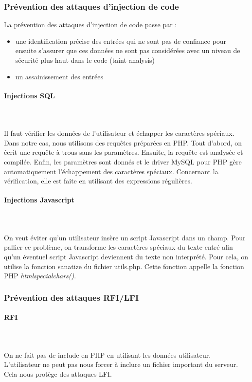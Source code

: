 \documentclass[a4paper]{article}
\begin{document}
\subsubsection{Prévention des attaques d'injection de code}
La prévention des attaques d'injection de code passe par :
\begin{itemize}
	\item une identification précise des entrées qui ne sont pas de
		confiance pour ensuite s'assurer que ces données ne sont pas
		considérées avec un niveau de sécurité plus haut dans le code
		(taint analysis) 
	\item un assainissement des entrées
\end{itemize}
		
\paragraph{Injections SQL}
~~\\
\\
Il faut vérifier les données de l'utilisateur et échapper les caractères spéciaux.
Dans notre cas, nous utilisons des requêtes préparées en PHP.
Tout d'abord, on écrit une requête à trous sans les paramètres. Ensuite, la
requête est analysée et compilée. Enfin, les paramètres sont donnés et le driver
MySQL pour PHP gère automatiquement l'échappement des caractères spéciaux.
Concernant la vérification, elle est faite en utilisant des expressions régulières.			
		
\paragraph{Injections Javascript}
~~\\
\\
On veut éviter qu'un utilisateur insère un script Javascript dans un champ.
Pour pallier ce problème, on transforme les caractères spéciaux du texte entré afin
qu'un éventuel script Javascript deviennent du texte non interprété.
Pour cela, on utilise la fonction sanatize du fichier utils.php. Cette fonction appelle
la fonction PHP \textit{htmlspecialchars()}.
		
\subsubsection{Prévention des attaques RFI/LFI}
		
\paragraph{RFI}
~~\\
\\
On ne fait pas de include en PHP en utilisant les données utilisateur.
L'utilisateur ne peut pas nous forcer à inclure un fichier important du serveur.
Cela nous protège des attaques LFI.
\end{document}
